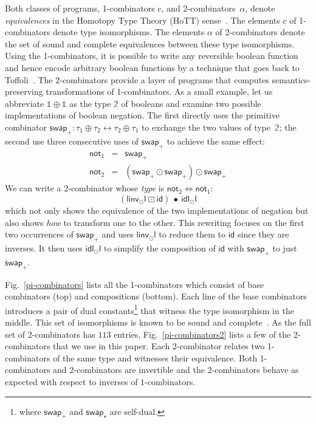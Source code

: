\documentclass[a4paper,USenglish]{lipics-v2016-utf8x}
\newcommand{\iso}{\leftrightarrow}
\newcommand{\isotwo}{\Leftrightarrow}
\newcommand{\ot}{\mathbb{1}}
\newcommand{\swapp}{\mathsf{{swap_+}}}
\newcommand{\swapt}{\mathsf{{swap_{\star}}}}
\newcommand{\idiso}{\mathsf{{id}}}
\newcommand{\idldl}{\mathsf{{idl_{\odot}l}}}
\newcommand{\linvdl}{\mathsf{{linv_{\odot}l}}}
\newcommand{\idisotwo}{\mathsf{{id}}}
\newcommand{\transtwo}{\bullet}
\newcommand{\respstwo}{\mathsf{{\boxdot}}}
\begin{document}
\noindent Both classes of programs, 1-combinators $c$, and
2-combinators~$\alpha$, denote \emph{equivalences} in the Homotopy Type
Theory (HoTT) sense~\cite{hottbook}. The
elements $c$ of 1-combinators denote type isomorphisms. The elements $\alpha$ of
2-combinators denote the set of sound and complete equivalences between these
type isomorphisms. Using the 1-combinators, it is possible to write any
reversible boolean function and hence encode arbitrary boolean functions by a
technique that goes back to Toffoli~\cite{Toffoli:1980}. The 2-combinators
provide a layer of programs that computes semantics-preserving transformations
of 1-combinators. As a small example, let us abbreviate $\ot \oplus \ot$ as the
type $\mathbb{2}$ of booleans and examine two possible implementations of
boolean negation. The first directly uses the primitive combinator
$\swapp : \tau_1 \oplus \tau_2 \iso \tau_2 \oplus \tau_1$ to exchange the two
values of type~$\mathbb{2}$; the second use three consecutive uses of $\swapp$
to achieve the same effect:
\[\begin{array}{rcl}
\mathsf{not_1} &=& \swapp \\
\mathsf{not_2} &=& (\swapp \odot \swapp) \odot \swapp
\end{array}\]
We can write a 2-combinator whose \emph{type} is $\mathsf{not_2}
\isotwo \mathsf{not_1}$:
\[
(\linvdl ~\respstwo~ \idisotwo)~\transtwo~\idldl
\]
which not only shows the equivalence of the two implementations of negation but
also shows \emph{how} to transform one to the other. This rewriting focuses
on the first two occurrences of $\swapp$ and uses $\linvdl$ to reduce them to
$\idiso$ since they are inverses. It then uses $\idldl$ to simplify the
composition of $\idiso$ with $\swapp$ to just $\swapp$.

Fig.~\ref{pi-combinators} lists all the 1-combinators which consist of base
combinators (top) and compositions (bottom). Each line of the base combinators
introduces a pair of dual constants\footnote{where $\swapp$ and $\swapt$ are
self-dual.} that witness the type isomorphism in the middle. This set of
isomorphisms is known to be sound and
complete~\cite{Fiore:2004,fiore-remarks}. As the full set of 2-combinators has
$113$ entries, Fig.~\ref{pi-combinators2} lists a few of the 2-combinators that
we use in this paper. Each 2-combinator relates two 1-combinators of the same
type and witnesses their equivalence. Both 1-combinators and 2-combinators are
invertible and the 2-combinators behave as expected with respect to inverses of
1-combinators.
\end{document}
